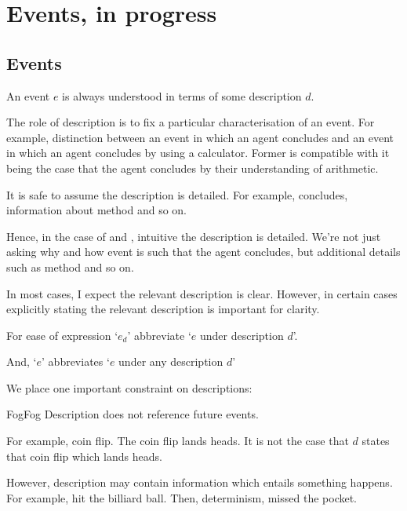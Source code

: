 \chapter{Events, in progress}
\label{cha:events-progress}


\section{Events}
\label{sec:events}


\begin{note}
  \begin{assumption}
    An event \(e\) is always understood in terms of some description \(d\).
  \end{assumption}

  The role of description is to fix a particular characterisation of an event.
  For example, distinction between an event in which an agent concludes and an event in which an agent concludes by using a calculator.
  Former is compatible with it being the case that the agent concludes by their understanding of arithmetic.

  It is safe to assume the description is detailed.
  For example, concludes, information about method and so on.

  {
    \color{red}
    Hence, in the case of \qWhy{} and \qHow{}, intuitive the description is detailed.
    We're not just asking why and how event is such that the agent concludes, but additional details such as method and so on.
  }

  In most cases, I expect the relevant description is clear.
  However, in certain cases explicitly stating the relevant description is important for clarity.

  \begin{notationList}
  \item
    For ease of expression `\(e_{d}\)' abbreviate `\(e\) under description \(d\)'.

    And, `\(e\)' abbreviates `\(e\) under any description \(d\)'
  \end{notationList}

  We place one important constraint on descriptions:

  \begin{constraint}{Fog}{Fog}
    Description does not reference future events.
  \end{constraint}

  For example, coin flip.
  The coin flip lands heads.
  It is not the case that \(d\) states that coin flip which lands heads.

  However, description may contain information which entails something happens.
  For example, hit the billiard ball.
  Then, determinism, missed the pocket.
\end{note}

